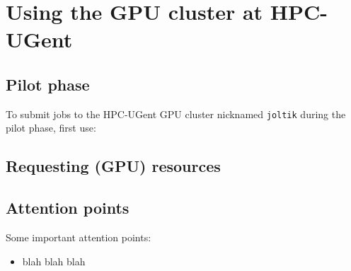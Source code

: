 \chapter{Using the GPU cluster at HPC-UGent}
\label{ch:gpu_ugent}


\section{Pilot phase}
\label{sec:gpu_ugent_pilot}

To submit jobs to the HPC-UGent GPU cluster nicknamed \lstinline|joltik| during the pilot phase, first use:

\begin{prompt}
\end{prompt}





\section{Requesting (GPU) resources}
\label{sec:gpu_ugent_resources}





\section{Attention points}
\label{sec:gpu_ugent_attention_points}

Some important attention points:

\begin{itemize}
\item blah blah blah
\end{itemize}





